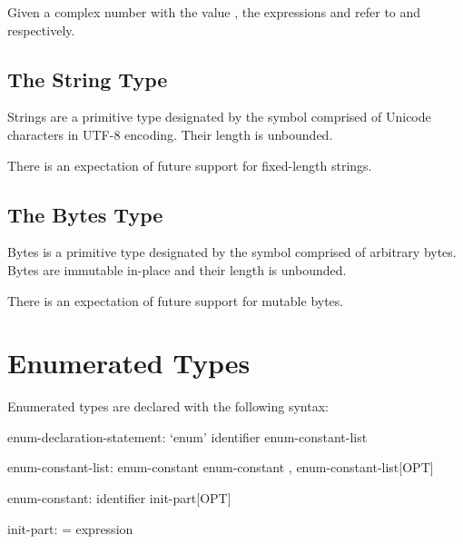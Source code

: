 \begin{example}
Given a complex number  with the value , the
expressions  and  refer to 
and  respectively.
\end{example}

\subsection{The String Type}
\label{The_String_Type}

Strings are a primitive type designated by the symbol  comprised of
Unicode characters in UTF-8 encoding.  Their length is unbounded.

\begin{openissue}
There is an expectation of future support for fixed-length strings.
\end{openissue}

\subsection{The Bytes Type}
\label{The_Bytes_Type}

Bytes is a primitive type designated by the symbol  comprised of
arbitrary bytes. Bytes are immutable in-place and their length is unbounded.

\begin{openissue}
There is an expectation of future support for mutable bytes.
\end{openissue}

\section{Enumerated Types}
\label{Enumerated_Types}

Enumerated types are declared with the following syntax:

\begin{syntax}
enum-declaration-statement:
  `enum' identifier { enum-constant-list }

enum-constant-list:
  enum-constant
  enum-constant , enum-constant-list[OPT]

enum-constant:
  identifier init-part[OPT]

init-part:
  = expression
\end{syntax}

